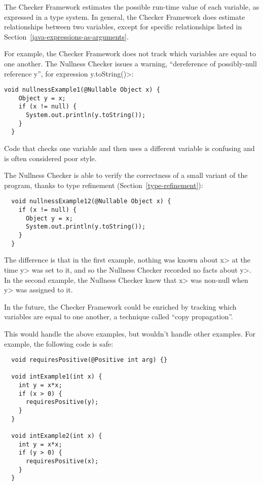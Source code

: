 


The Checker Framework estimates the possible run-time value of each
variable, as expressed in a type system.  In general, the Checker Framework
does estimate relationships between two variables, except for specific
relationships listed in Section~\ref{java-expressions-as-arguments}.

For example, the Checker Framework does not track which variables are equal
to one another.  The Nullness Checker issues a warning, ``dereference of
possibly-null reference y'', for expression \<y.toString()>:

\begin{Verbatim}
void nullnessExample1(@Nullable Object x) {
    Object y = x;
    if (x != null) {
      System.out.println(y.toString());
    }
  }
\end{Verbatim}

\noindent
Code that checks one variable and then uses a different variable is
confusing and is often considered poor style.

The Nullness Checker is able to verify the correctness of a small variant
of the program, thanks to type refinement
(Section~\ref{type-refinement}):

\begin{Verbatim}
  void nullnessExample12(@Nullable Object x) {
    if (x != null) {
      Object y = x;
      System.out.println(y.toString());
    }
  }
\end{Verbatim}

The difference is that in the first example, nothing was known about \<x> at
the time \<y> was set to it, and so the Nullness Checker recorded no facts
about \<y>.  In the second example, the Nullness Checker knew that \<x>
was non-null when \<y> was assigned to it.

In the future, the Checker Framework could be enriched by tracking which
variables are equal to one another, a technique called ``copy
propagation''.

This would handle the above examples, but wouldn't handle other examples.
For example, the following code is safe:

\begin{Verbatim}
  void requiresPositive(@Positive int arg) {}

  void intExample1(int x) {
    int y = x*x;
    if (x > 0) {
      requiresPositive(y);
    }
  }

  void intExample2(int x) {
    int y = x*x;
    if (y > 0) {
      requiresPositive(x);
    }
  }
\end{Verbatim}

